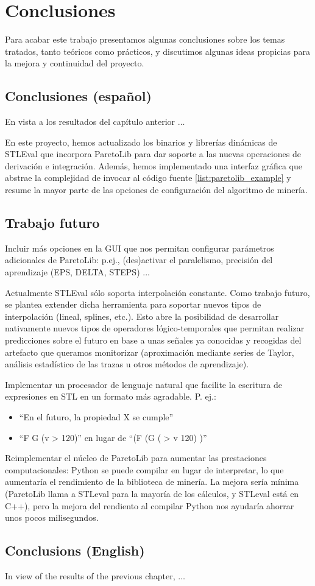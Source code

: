 \chapter{Conclusiones}
\label{cha:concl}
Para acabar este trabajo presentamos algunas conclusiones sobre los temas tratados, tanto teóricos como prácticos, y discutimos algunas ideas propicias para la mejora y continuidad del proyecto.
\section{Conclusiones (español)}
En vista a los resultados del capítulo anterior $\ldots$

En este proyecto, hemos actualizado los binarios y librerías dinámicas de STLEval que incorpora ParetoLib para dar soporte a las nuevas operaciones de derivación e integración. Además, hemos implementado una interfaz gráfica que abstrae la complejidad de invocar al código fuente \ref{list:paretolib_example} y resume la mayor parte de las opciones de configuración del algoritmo de minería.

\section{Trabajo futuro}

Incluir más opciones en la GUI que nos permitan configurar parámetros adicionales de ParetoLib: p.ej., (des)activar el paralelismo, precisión del aprendizaje (EPS, DELTA, STEPS) ...

Actualmente STLEval sólo soporta interpolación constante. Como trabajo futuro, se plantea extender dicha herramienta para soportar nuevos tipos de interpolación (lineal, splines, etc.). Esto abre la posibilidad de desarrollar nativamente nuevos tipos de operadores lógico-temporales que permitan realizar predicciones sobre el futuro en base a unas señales ya conocidas y recogidas del artefacto que queramos monitorizar (aproximación mediante series de Taylor, análisis estadístico de las trazas u otros métodos de aprendizaje).

Implementar un procesador de lenguaje natural que facilite la escritura de expresiones en STL en un formato más agradable. P. ej.:
\begin{itemize}
 \item ``En el futuro, la propiedad X se cumple''
 \item ``F G (v > 120)'' en lugar de ``(F (G ( > v 120) )''
\end{itemize}

Reimplementar el núcleo de ParetoLib para aumentar las prestaciones computacionales: Python se puede compilar en lugar de interpretar, lo que aumentaría el rendimiento de la biblioteca de minería. La mejora sería mínima (ParetoLib llama a STLeval para la mayoría de los cálculos, y STLeval está en C++), pero la mejora del rendiento al compilar Python nos ayudaría ahorrar unos pocos milisegundos.

\section{Conclusions (English)}
In view of the results of the previous chapter, $\ldots$


